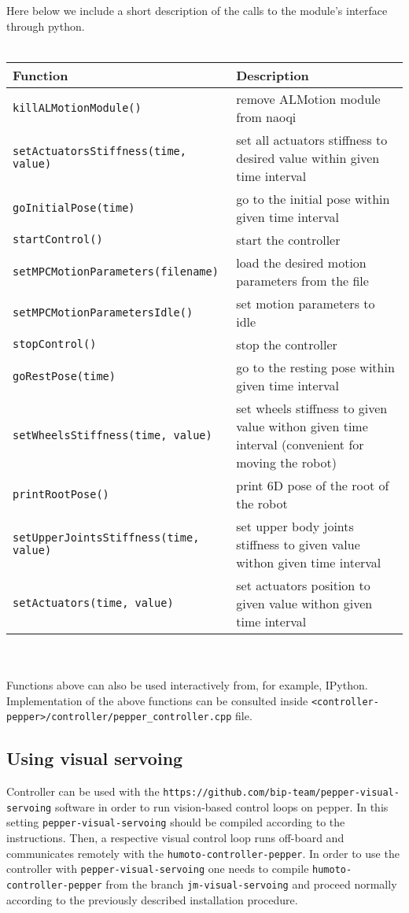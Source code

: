 \noindent Here below we include a short description of the calls to the module's interface through python. \\ \\
\begin{tabular}{|l|p{5cm}|}
\hline
Function & Description \\
\hline
\texttt{killALMotionModule()} & remove ALMotion module from naoqi \\
\hline
\texttt{setActuatorsStiffness(time, value)} & set all actuators stiffness to desired
value within given time interval \\
\hline
\texttt{goInitialPose(time)} & go to the initial pose within given time interval \\
\hline
\texttt{startControl()} & start the controller \\
\hline
\texttt{setMPCMotionParameters(filename)} & load the desired motion parameters from the file \\
\hline
\texttt{setMPCMotionParametersIdle()} & set motion parameters to idle \\
\hline
\texttt{stopControl()} & stop the controller \\
\hline
\texttt{goRestPose(time)} & go to the resting pose within given time interval \\
\hline
\texttt{setWheelsStiffness(time, value)} & set wheels stiffness to given value withon given time interval (convenient for moving the
robot) \\
\hline
\texttt{printRootPose()} & print 6D pose of the root of the robot \\
\hline
\texttt{setUpperJointsStiffness(time, value)} & set upper body joints stiffness to given value withon given time interval \\
\hline
\texttt{setActuators(time, value)} & set actuators position to given value withon given time interval \\
\hline
\end{tabular} \\ \\

\noindent Functions above can also be used interactively from, for example, IPython. Implementation of the above
functions can be consulted inside \texttt{<controller-pepper>/controller/pepper\_controller.cpp} file.

\subsection{Using visual servoing}
\noindent Controller can be used with the \texttt{https://github.com/bip-team/pepper-visual-servoing}
software in order to run vision-based control loops on pepper. 
In this setting \texttt{pepper-visual-servoing} should be compiled according to the instructions. Then,
a respective visual control loop runs off-board and communicates remotely with the \texttt{humoto-controller-pepper}. 
In order to use the controller with \texttt{pepper-visual-servoing} one needs to compile \texttt{humoto-controller-pepper} from the branch
\texttt{jm-visual-servoing} and proceed normally according to the previously described installation procedure. \\ 

